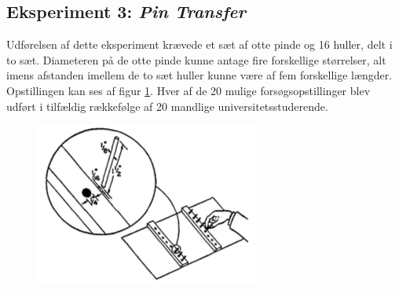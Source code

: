 \subsection*{Eksperiment 3: \textit{Pin Transfer}}
Udførelsen af dette eksperiment krævede et sæt af otte pinde og 16 huller, delt i to sæt. Diameteren på de otte pinde kunne antage fire forskellige størrelser, alt imens afstanden imellem de to sæt huller kunne være af fem forskellige længder. Opstillingen kan ses af figur \ref{fig:FittsEx3}.
Hver af de 20 mulige forsøgsopstillinger blev udført i tilfældig rækkefølge af 20 mandlige universitetsstuderende.
\begin{figure}[h]
\centering
\includegraphics[width=0.5\linewidth]{images/illustrations/fitt_ex3}
\label{fig:FittsEx3}
\end{figure}

